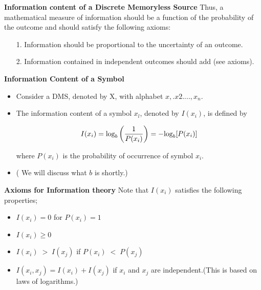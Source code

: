 \documentclass[a4]{beamer}
\begin{document}

\noindent \textbf{Information content of a Discrete Memoryless Source}
Thus, a mathematical measure of information should be a function of the probability of the outcome and should satisfy the following axioms:
\begin{itemize}
\item[1.] Information should be proportional to the uncertainty of an outcome.
\item[2.] Information contained in independent outcomes should add (see axioms).
\end{itemize}



\noindent \textbf{Information Content of a Symbol}
\vspace{-1cm}
\begin{itemize}
\item Consider a DMS, denoted by X, with alphabet ${x,.x2. ...,x_n}$.
\item The information content of a symbol
$x_l$, denoted by $I(x_i)$, is defined by

\[  I(x_i)  = \mbox{log}_b\left({1 \over P(x_i)}\right) =  -\mbox{log}_b[ P(x_i) ]  \]


where $P(x_i)$ is the probability of occurrence of symbol $x_i$. \item ( We will discuss what $b$ is shortly.)
\end{itemize}




\noindent \textbf{Axioms for Information theory}
Note that $I(x_i)$ satisfies the following properties;
\begin{itemize}
\item $I(x_i) = 0 $ for $P(x_i) = 1$ %
\item $I(x_i) \geq 0 $
\item $I(x_i) \; >\; I(x_j)$  if $P(x_i)\; < \; P(x_j)$
\item $I(x_i, x_j)  = I(x_i) + I(x_j)$ if $x_i$ and $x_j$ are independent.(This is based on laws of logarithms.)
\end{itemize}
\end{document}
